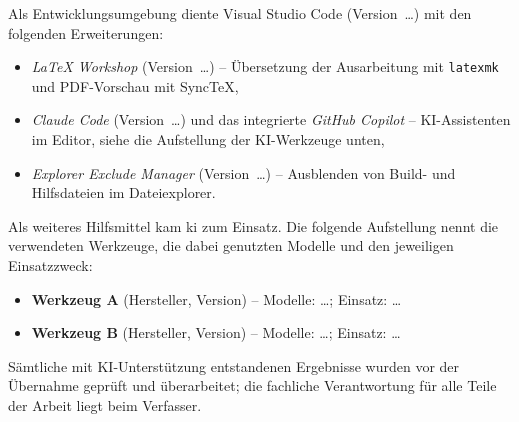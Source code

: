 Als Entwicklungsumgebung diente Visual Studio Code (Version~\dots) mit den
folgenden Erweiterungen:
\begin{itemize}[itemsep=0pt, parsep=0pt, topsep=4pt]
    \item \textit{LaTeX Workshop} (Version~\dots) -- Übersetzung der Ausarbeitung
        mit \texttt{latexmk} und PDF-Vorschau mit SyncTeX,
    \item \textit{Claude Code} (Version~\dots) und das integrierte \textit{GitHub
        Copilot} -- KI-Assistenten im Editor, siehe die Aufstellung der
        KI-Werkzeuge unten,
    \item \textit{Explorer Exclude Manager} (Version~\dots) -- Ausblenden von
        Build- und Hilfsdateien im Dateiexplorer.
\end{itemize}

Als weiteres Hilfsmittel kam \ac{ki} zum Einsatz. Die folgende Aufstellung nennt
die verwendeten Werkzeuge, die dabei genutzten Modelle und den jeweiligen
Einsatzzweck:
\begin{itemize}[itemsep=0pt, parsep=0pt, topsep=4pt]
    \item \textbf{Werkzeug A} (Hersteller, Version) -- Modelle: \dots; Einsatz: \dots
    \item \textbf{Werkzeug B} (Hersteller, Version) -- Modelle: \dots; Einsatz: \dots
\end{itemize}

Sämtliche mit KI-Unterstützung entstandenen Ergebnisse wurden vor der Übernahme
geprüft und überarbeitet; die fachliche Verantwortung für alle Teile der Arbeit
liegt beim Verfasser.
